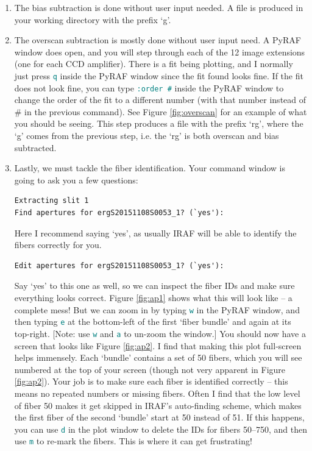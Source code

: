 \documentclass[12pt]{report}
\newcommand{\ty}[1]{\textcolor{teal}{\texttt{#1}}}
\begin{document}
\begin{enumerate}
\item The bias subtraction is done without user input needed. A file is produced in your working directory with the prefix `g'.
\item The overscan subtraction is mostly done without user input need. A PyRAF window does open, and you will step through each of the 12 image extensions (one for each CCD amplifier). There is a fit being plotting, and I normally just press \ty{q} inside the PyRAF window since the fit found looks fine. If the fit does not look fine, you can type \ty{:order \#} inside the PyRAF window to change the order of the fit to a different number (with that number instead of \# in the previous command). See Figure \ref{fig:overscan} for an example of what you should be seeing. This step produces a file with the prefix `rg', where the `g' comes from the previous step, i.e. the `rg' is both overscan and bias subtracted.
\item Lastly, we must tackle the fiber identification. Your command window is going to ask you a few questions:
\begin{verbatim}
Extracting slit 1
Find apertures for ergS20151108S0053_1? (`yes'): 
\end{verbatim}
Here I recommend saying `yes', as usually IRAF will be able to identify the fibers correctly for you. 
\begin{verbatim}
Edit apertures for ergS20151108S0053_1? (`yes'): 
\end{verbatim}
Say `yes' to this one as well, so we can inspect the fiber IDs and make sure everything looks correct. Figure \ref{fig:ap1} shows what this will look like -- a complete mess! But we can zoom in by typing \ty{w} in the PyRAF window, and then typing \ty{e} at the bottom-left of the first `fiber bundle' and again at its top-right. [Note: use \ty{w} and \ty{a} to un-zoom the window.] You should now have a screen that looks like Figure \ref{fig:ap2}. I find that making this plot full-screen helps immensely. Each `bundle' contains a set of 50 fibers, which you will see numbered at the top of your screen (though not very apparent in Figure \ref{fig:ap2}). Your job is to make sure each fiber is identified correctly -- this means no repeated numbers or missing fibers. Often I find that the low level of fiber 50 makes it get skipped in IRAF's auto-finding scheme, which makes the first fiber of the second `bundle' start at 50 instead of 51. If this happens, you can use \ty{d} in the plot window to delete the IDs for fibers 50--750, and then use \ty{m} to re-mark the fibers. This is where it can get frustrating! \\


\end{enumerate}
\end{document}
